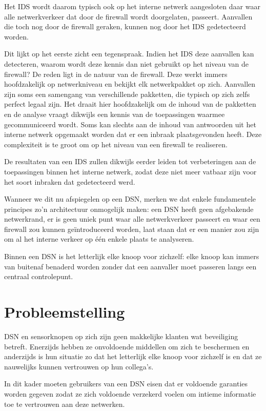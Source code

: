 Het IDS wordt daarom typisch ook op het interne netwerk aangesloten daar waar
alle netwerkverkeer dat door de firewall wordt doorgelaten, passeert. Aanvallen
die toch nog door de firewall geraken, kunnen nog door het IDS gedetecteerd
worden.

Dit lijkt op het eerste zicht een tegenspraak. Indien het IDS deze aanvallen
kan detecteren, waarom wordt deze kennis dan niet gebruikt op het niveau van de
firewall? De reden ligt in de natuur van de firewall. Deze werkt immers
hoofdzakelijk op netwerkniveau en bekijkt elk netwerkpakket op zich. Aanvallen
zijn soms een samengang van verschillende pakketten, die typisch op zich zelfs
perfect legaal zijn. Het draait hier hoofdzakelijk om de inhoud van de
pakketten en de analyse vraagt dikwijls een kennis van de toepassingen waarmee
gecommuniceerd wordt. Soms kan slechts aan de inhoud van antwoorden uit het
interne netwerk opgemaakt worden dat er een inbraak plaatsgevonden heeft. Deze
complexiteit is te groot om op het niveau van een firewall te realiseren.

De resultaten van een IDS zullen dikwijls eerder leiden tot verbeteringen aan
de toepassingen binnen het interne netwerk, zodat deze niet meer vatbaar zijn
voor het soort inbraken dat gedetecteerd werd.

Wanneer we dit nu afspiegelen op een DSN, merken we dat enkele fundamentele
principes zo'n architectuur onmogelijk maken: een DSN heeft geen afgebakende
netwerkrand, er is geen uniek punt waar alle netwerkverkeer passeert en waar
een firewall zou kunnen ge\"introduceerd worden, laat staan dat er een manier
zou zijn om al het interne verkeer op \'e\'en enkele plaats te analyseren.

Binnen een DSN is het letterlijk elke knoop voor zichzelf: elke knoop kan
immers van buitenaf benaderd worden zonder dat een aanvaller moet passeren
langs een centraal controlepunt.

\section{Probleemstelling}
\label{section:probleem}

DSN en sensorknopen op zich zijn geen makkelijke klanten wat beveiliging
betreft. Enerzijds hebben ze onvoldoende middellen om zich te beschermen en
anderzijds is hun situatie zo dat het letterlijk elke knoop voor zichzelf is en
dat ze nauwelijks kunnen vertrouwen op hun collega's.

In dit kader moeten gebruikers van een DSN eisen dat er voldoende garanties
worden gegeven zodat ze zich voldoende verzekerd voelen om intieme informatie
toe te vertrouwen aan deze netwerken.

